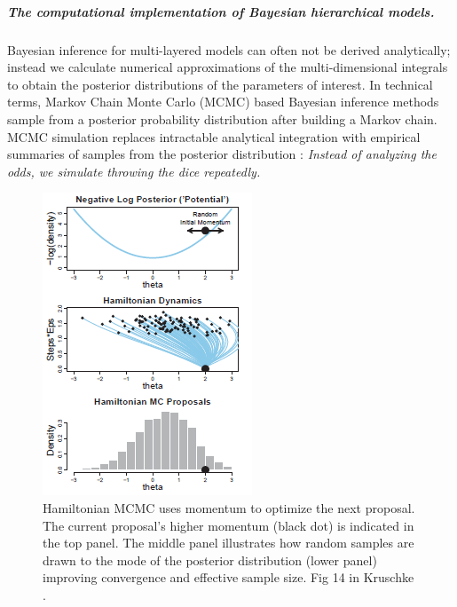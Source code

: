 \documentclass[11pt,notitlepage]{article}
\begin{document}
\subparagraph*{The computational implementation of Bayesian hierarchical models.}
Bayesian inference for multi-layered models can often not be derived analytically; instead we calculate numerical approximations of the multi-dimensional integrals to obtain the posterior distributions of the parameters of interest. In technical terms, Markov Chain Monte Carlo (MCMC) based Bayesian inference methods sample from a posterior probability distribution after building a Markov chain. MCMC simulation replaces intractable analytical integration with empirical summaries of samples from the posterior distribution \cite{Abrams_9483729}: \textit{Instead of analyzing the odds, we simulate throwing the dice repeatedly.}

\begin{figure}
 \includegraphics[scale=1]{Figures/Hamiltonian.png}
  \vspace{-20pt}
  \caption{\footnotesize Hamiltonian MCMC uses momentum to optimize the next proposal. The current proposal's higher momentum (black dot) is indicated in the top panel. The middle panel illustrates how random samples are drawn to the mode of the posterior distribution (lower panel) improving convergence and effective sample size. Fig 14 in Kruschke \cite{Kruschke_Book_2014}.}
    \label{fig:Hamiltonian}
 \vspace{- 10 pt}
\end{figure}
\end{document}
